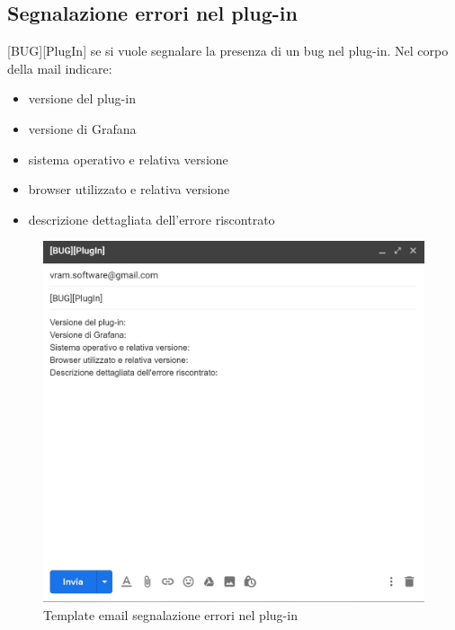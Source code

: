 	\subsection{Segnalazione errori nel plug-in}
 	[BUG][PlugIn] se si vuole segnalare la presenza di un bug nel plug-in.
 	Nel corpo della mail indicare:
 	\begin{itemize}
 		\item versione del plug-in
 		\item versione di Grafana
 		\item sistema operativo e relativa versione
 		\item browser utilizzato e relativa versione
 		\item descrizione dettagliata dell'errore riscontrato
 	\end{itemize}
 	\mbox{}
 	\begin{figure} [H]
 		\begin{center}
 			\includegraphics[width=120mm]{./img/erroriPlugIn.jpg}
 		\end{center}
 		\caption{Template email segnalazione errori nel plug-in}
 	\end{figure}
